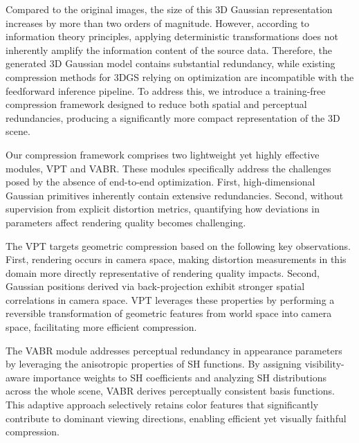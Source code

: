 \documentclass[lettersize,journal]{IEEEtran}
\begin{document}
Compared to the original images, the size of this 3D Gaussian representation increases by more than two orders of magnitude. However, according to information theory principles, applying deterministic transformations does not inherently amplify the information content of the source data. Therefore, the generated 3D Gaussian model contains substantial redundancy, while existing compression methods for 3DGS relying on optimization are incompatible with the feedforward inference pipeline. To address this, we introduce a training-free compression framework designed to reduce both spatial and perceptual redundancies, producing a significantly more compact representation of the 3D scene.

Our compression framework comprises two lightweight yet highly effective modules, VPT and VABR. These modules specifically address the challenges posed by the absence of end-to-end optimization. First, high-dimensional Gaussian primitives inherently contain extensive redundancies. Second, without supervision from explicit distortion metrics, quantifying how deviations in parameters affect rendering quality becomes challenging.

The VPT targets geometric compression based on the following key observations. First, rendering occurs in camera space, making distortion measurements in this domain more directly representative of rendering quality impacts. Second, Gaussian positions derived via back-projection exhibit stronger spatial correlations in camera space. VPT leverages these properties by performing a reversible transformation of geometric features from world space into camera space, facilitating more efficient compression.

The VABR module addresses perceptual redundancy in appearance parameters by leveraging the anisotropic properties of SH functions. By assigning visibility-aware importance weights to SH coefficients and analyzing SH distributions across the whole scene, VABR derives perceptually consistent basis functions. This adaptive approach selectively retains color features that significantly contribute to dominant viewing directions, enabling efficient yet visually faithful compression.

\end{document}
